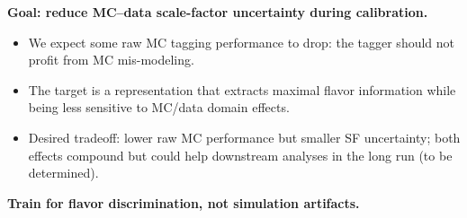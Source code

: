 \begin{frame}[plain]

  \vspace{16mm}
  {\small\textbf{Goal: reduce MC--data scale-factor uncertainty during calibration.}}\par

  \vspace{4mm}
  \begin{itemize}\tightlist
    \item We expect some raw MC tagging performance to drop: the tagger should not profit from MC mis-modeling.
    \item The target is a representation that extracts maximal flavor information while being less sensitive to MC/data domain effects.
    \item Desired tradeoff: lower raw MC performance but smaller SF uncertainty; both effects compound but could help downstream analyses in the long run (to be determined).
  \end{itemize}

  \vspace{5mm}
  \begin{center}
    {\large\color{argonneBlue}\textbf{Train for flavor discrimination, not simulation artifacts.}}
  \end{center}

  \slideheaderfooter
\end{frame}

